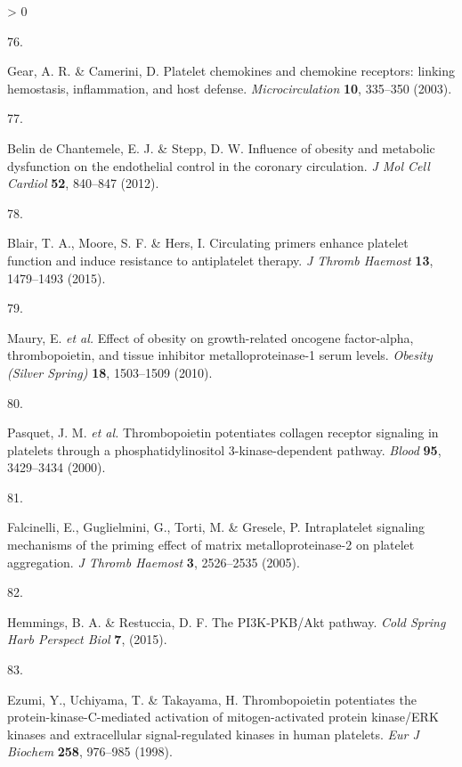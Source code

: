 \documentclass[11pt,twoside]{bristolthesis}
\newlength{\cslhangindent}
\newlength{\csllabelwidth}
\newenvironment{CSLReferences}[2] %
 {%
  \setlength{\parindent}{0pt}
  \ifodd #1 \everypar{\setlength{\hangindent}{\cslhangindent}}\ignorespaces\fi
  \ifnum #2 > 0
  \setlength{\parskip}{#2\baselineskip}
  \fi
 }%
 {}
\newcommand{\CSLLeftMargin}[1]{\parbox[t]{\csllabelwidth}{#1}}
\newcommand{\CSLRightInline}[1]{\parbox[t]{\linewidth - \csllabelwidth}{#1}\break}
\begin{document}
\begin{CSLReferences}{0}{0}
\leavevmode\hypertarget{ref-Gear2003}{}%
\CSLLeftMargin{76. }
\CSLRightInline{Gear, A. R. \& Camerini, D. {Platelet chemokines and chemokine receptors: linking hemostasis, inflammation, and host defense}. \emph{Microcirculation} \textbf{10}, 335--350 (2003).}

\leavevmode\hypertarget{ref-BelindeChantemele2012a}{}%
\CSLLeftMargin{77. }
\CSLRightInline{Belin de Chantemele, E. J. \& Stepp, D. W. {Influence of obesity and metabolic dysfunction on the endothelial control in the coronary circulation}. \emph{J Mol Cell Cardiol} \textbf{52}, 840--847 (2012).}

\leavevmode\hypertarget{ref-Blair2015}{}%
\CSLLeftMargin{78. }
\CSLRightInline{Blair, T. A., Moore, S. F. \& Hers, I. {Circulating primers enhance platelet function and induce resistance to antiplatelet therapy}. \emph{J Thromb Haemost} \textbf{13}, 1479--1493 (2015).}

\leavevmode\hypertarget{ref-Maury2010}{}%
\CSLLeftMargin{79. }
\CSLRightInline{Maury, E. \emph{et al.} {Effect of obesity on growth-related oncogene factor-alpha, thrombopoietin, and tissue inhibitor metalloproteinase-1 serum levels}. \emph{Obesity (Silver Spring)} \textbf{18}, 1503--1509 (2010).}

\leavevmode\hypertarget{ref-Pasquet2000}{}%
\CSLLeftMargin{80. }
\CSLRightInline{Pasquet, J. M. \emph{et al.} {Thrombopoietin potentiates collagen receptor signaling in platelets through a phosphatidylinositol 3-kinase-dependent pathway}. \emph{Blood} \textbf{95}, 3429--3434 (2000).}

\leavevmode\hypertarget{ref-Falcinelli2005}{}%
\CSLLeftMargin{81. }
\CSLRightInline{Falcinelli, E., Guglielmini, G., Torti, M. \& Gresele, P. {Intraplatelet signaling mechanisms of the priming effect of matrix metalloproteinase-2 on platelet aggregation}. \emph{J Thromb Haemost} \textbf{3}, 2526--2535 (2005).}

\leavevmode\hypertarget{ref-Hemmings2015}{}%
\CSLLeftMargin{82. }
\CSLRightInline{Hemmings, B. A. \& Restuccia, D. F. {The PI3K-PKB/Akt pathway}. \emph{Cold Spring Harb Perspect Biol} \textbf{7}, (2015).}

\leavevmode\hypertarget{ref-Ezumi1998}{}%
\CSLLeftMargin{83. }
\CSLRightInline{Ezumi, Y., Uchiyama, T. \& Takayama, H. {Thrombopoietin potentiates the protein-kinase-C-mediated activation of mitogen-activated protein kinase/ERK kinases and extracellular signal-regulated kinases in human platelets}. \emph{Eur J Biochem} \textbf{258}, 976--985 (1998).}


\end{CSLReferences}
\end{document}
